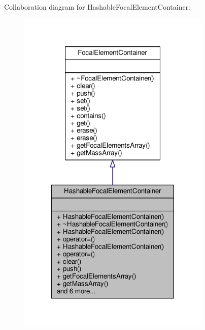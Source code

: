 Collaboration diagram for Hashable\+Focal\+Element\+Container\+:\nopagebreak
\begin{figure}[H]
\begin{center}
\leavevmode
\includegraphics[width=261pt]{classHashableFocalElementContainer__coll__graph}
\end{center}
\end{figure}
